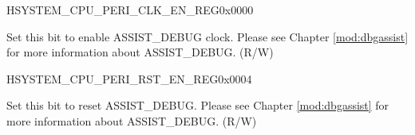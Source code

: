 \begin{register}{H}{SYSTEM\_CPU\_PERI\_CLK\_EN\_REG}{0x0000}\label{regdesc:SYSTEMCPUPERICLKENREG}
%
%
%
\regnewline%
\begin{regdesc}\begin{reglist}
\label{fielddesc:SYSTEMCLKENASSISTDEBUG}\item [SYSTEM\_CLK\_EN\_ASSIST\_DEBUG] Set this bit to enable ASSIST\_DEBUG clock. Please see Chapter \ref{mod:dbgassist}
\textit{} for more information about ASSIST\_DEBUG. (R/W)
\end{reglist}\end{regdesc}
\end{register}


\begin{register}{H}{SYSTEM\_CPU\_PERI\_RST\_EN\_REG}{0x0004}\label{regdesc:SYSTEMCPUPERIRSTENREG}
%
%
%
\regnewline%
\begin{regdesc}\begin{reglist}
\label{fielddesc:SYSTEMRSTENASSISTDEBUG}\item [SYSTEM\_RST\_EN\_ASSIST\_DEBUG] Set this bit to reset ASSIST\_DEBUG. Please see Chapter \ref{mod:dbgassist}
\textit{} for more information about ASSIST\_DEBUG. (R/W)
\end{reglist}\end{regdesc}
\end{register}


